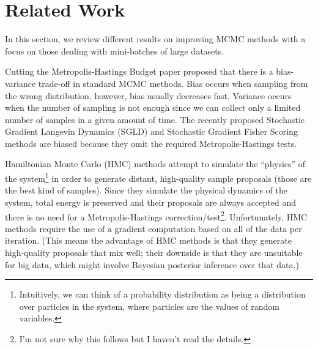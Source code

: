 \documentclass{article}
\begin{document}
\section{Related Work}\label{sec:related_work}

In this section, we review different results on improving MCMC methods with a focus on those dealing
with mini-batches of large datasets. 

Cutting the Metropolis-Hastings Budget paper \cite{ cutting_mh_2014} proposed that there is a bias-variance trade-off in standard MCMC methods. Bias occurs when sampling from the wrong distribution, however, bias usually decreases fast. Variance occurs when the number of sampling is not enough since we can collect only a limited number of samples in a given amount of time. The recently proposed Stochastic Gradient Langevin Dynamics (SGLD) \cite{langevin_2011} and Stochastic Gradient Fisher Scoring methods are biased because they omit the required Metropolis-Hastings tests.


Hamiltonian Monte Carlo (HMC) methods attempt to simulate the ``physics'' of the
system\footnote{Intuitively, we can think of a probability distribution as being a distribution over
particles in the system, where particles are the values of random variables.} in order to generate
distant, high-quality sample proposals (those are the best kind of samples). Since they simulate the
physical dynamics of the system, total energy is preserved and their proposals are always
accepted and there is no need for a Metropolis-Hastings correction/test\footnote{I'm not sure why
this follows but I haven't read the details.}. Unfortunately, HMC methods require the use of a
gradient computation based on all of the data per iteration. (This means the advantage of HMC
methods is that they generate high-quality proposals that mix well; their downside is that they are
unsuitable for big data, which might involve Bayesian posterior inference over that data.)
\end{document}
